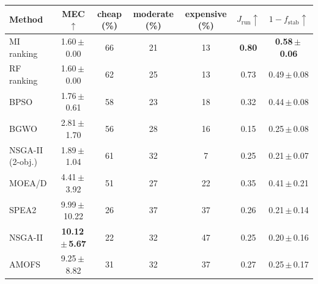 \begin{tabular}{lcccccc}
\toprule
Method & MEC$\uparrow$ & cheap (\%) & moderate (\%) & expensive (\%) & $J_{\mathrm{run}}\uparrow$ & $1-f_{\mathrm{stab}}\uparrow$ \\
\midrule
MI ranking & 1.60\,$\pm$\,0.00 & 66 & 21 & 13 & \textbf{0.80} & \textbf{0.58\,$\pm$\,0.06} \\
RF ranking & 1.60\,$\pm$\,0.00 & 62 & 25 & 13 & 0.73 & 0.49\,$\pm$\,0.08 \\
BPSO & 1.76\,$\pm$\,0.61 & 58 & 23 & 18 & 0.32 & 0.44\,$\pm$\,0.08 \\
BGWO & 2.81\,$\pm$\,1.70 & 56 & 28 & 16 & 0.15 & 0.25\,$\pm$\,0.08 \\
NSGA-II (2-obj.) & 1.89\,$\pm$\,1.04 & 61 & 32 & 7 & 0.25 & 0.21\,$\pm$\,0.07 \\
MOEA/D & 4.41\,$\pm$\,3.92 & 51 & 27 & 22 & 0.35 & 0.41\,$\pm$\,0.21 \\
SPEA2 & 9.99\,$\pm$\,10.22 & 26 & 37 & 37 & 0.26 & 0.21\,$\pm$\,0.14 \\
NSGA-II & \textbf{10.12\,$\pm$\,5.67} & 22 & 32 & 47 & 0.25 & 0.20\,$\pm$\,0.16 \\
AMOFS & 9.25\,$\pm$\,8.82 & 31 & 32 & 37 & 0.27 & 0.25\,$\pm$\,0.17 \\
\bottomrule
\end{tabular}
